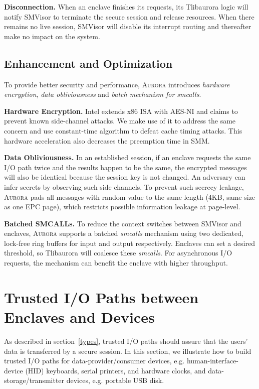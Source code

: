 \textbf{Disconnection.}
When an enclave finishes its requests, its Tlibaurora logic will notify SMVisor to terminate the secure session and release resources. When there remains no live session, SMVisor will disable its interrupt routing and thereafter make no impact on the system.

\subsection{Enhancement and Optimization}\label{enhancement}
To provide better security and performance, \textsc{Aurora} introduces \textit{hardware encryption}, \textit{data obliviousness} and \textit{batch mechanism for smcalls}.

\textbf{Hardware Encryption.}
Intel extends x86 ISA with AES-NI and claims to prevent known side-channel attacks. We make use of it to address the same concern and use constant-time algorithm to defeat cache timing attacks. This hardware acceleration also decreases the preemption time in SMM.

\textbf{Data Obliviousness.}
In an established session, if an enclave requests the same I/O path twice and the results happen to be the same, the encrypted messages will also be identical because the session key is not changed. An adversary can infer secrets by observing such side channels. To prevent such secrecy leakage, \textsc{Aurora} pads all messages with random value to the same length (4KB, same size as one EPC page), which restricts possible information leakage at page-level. %

\textbf{Batched SMCALLs.}\label{batch}
To reduce the context switches between SMVisor and enclaves, \textsc{Aurora} supports a batched \textit{smcalls} mechanism using two dedicated, lock-free ring buffers for input and output respectively. %
Enclaves can set a desired threshold, so Tlibaurora will coalesce these \textit{smcalls}. For asynchronous I/O requests, the mechanism can benefit the enclave with higher throughput.


\section{Trusted I/O Paths between Enclaves and Devices}\label{tpaths}

As described in section~\autoref{types},  trusted I/O paths  should assure that the users' data is transferred by a secure session. 
In this section, we illustrate how to build trusted I/O paths for data-provider/consumer devices, e.g. human-interface-device (HID) keyboards, serial printers, and hardware clocks, and data-storage/transmitter devices, e.g. portable USB disk.

